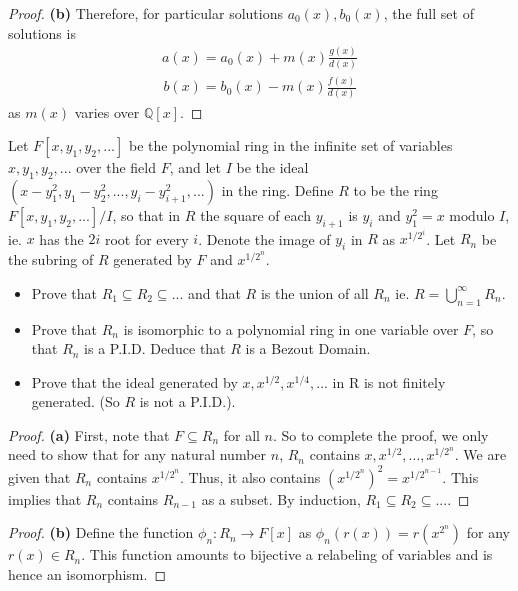 \documentclass[10pt]{article}
\newenvironment{problem}[2][Problem]{\begin{trivlist}
		\item[\hskip \labelsep {\bfseries #1}\hskip \labelsep {\bfseries #2.}]}{\end{trivlist}}
\begin{document}
\begin{problem}{2.11}
\begin{proof}{\textbf{(b)}}
			Therefore, for particular solutions $a_0(x), b_0(x)$, the full set of solutions is 
			\begin{align*}
				a(x) = a_0(x) + m(x) \frac{g(x)}{d(x)}
			\end{align*}
			\begin{align*}
				b(x) = b_0(x) - m(x) \frac{f(x)}{d(x)}
			\end{align*}
			as $m(x)$ varies over $\mathbb{Q}[x]$.
		\end{proof}
	\end{problem}
	
	\begin{problem}{2.12}
		Let $F[x, y_1, y_2, ...]$ be the polynomial ring in the infinite set of variables $x, y_1, y_2,...$ over the field $F$, and let $I$ be the ideal $(x-y_1^2, y_1-y_2^2, ... , y_i-y_{i+1}^2, ...)$ in the ring. Define $R$ to be the ring $F[x,y_1,y_2,...]/I$, so that in $R$ the square of each $y_{i+1}$ is $y_i$ and $y_1^2=x \text{ modulo }I$, ie. $x$ has the $2i$ root for every $i$. Denote the image of $y_i$ in $R$ as $x^{1/2^i}$. Let $R_n$ be the subring of $R$ generated by $F$ and $x^{1/2^n}$.
		
		\begin{itemize}
			\item[\textbf{(a)}] Prove that $R_1 \subseteq R_2 \subseteq ...$ and that $R$ is the union of all $R_n$ ie. $R = \bigcup^{\infty}_{n=1}R_n$.
			\item[\textbf{(b)}] Prove that $R_n$ is isomorphic to a polynomial ring in one variable over $F$, so that $R_n$ is a P.I.D. Deduce that $R$ is a Bezout Domain.
			\item[\textbf{(c)}] Prove that the ideal generated by $x, x^{1/2}, x^{1/4}, ... $ in R is not finitely generated. (So $R$ is not a P.I.D.).
		\end{itemize}
		\begin{proof}{\textbf{(a)}}
			First, note that $F \subseteq R_n$ for all $n$. So to complete the proof, we only need to show that for any natural number $n$, $R_n$ contains $x, x^{1/2}, ... , x^{1/2^n}$. We are given that $R_n$ contains $x^{1/2^n}$. Thus, it also contains $(x^{1/2^n})^2 = x^{1/2^{n-1}}$. This implies that $R_n$ contains $R_{n-1}$ as a subset. By induction, $R_1 \subseteq R_2 \subseteq ...$.
		\end{proof}
		
		\begin{proof}{\textbf{(b)}}
			Define the function $\phi_n:R_n \rightarrow F[x]$ as $\phi_n(r(x))=r(x^{2^n})$ for any $r(x) \in R_n$. This function amounts to bijective a relabeling of variables and is hence an isomorphism. 
			

\end{proof}
\end{problem}
\end{document}
